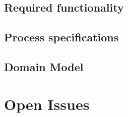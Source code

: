 \documentclass[12pt, oneside]{article}
\begin{document}
\subsection{Required functionality}
\subsection{Process specifications}
\subsection{Domain Model}
\section{Open Issues}


  
\end{document}
